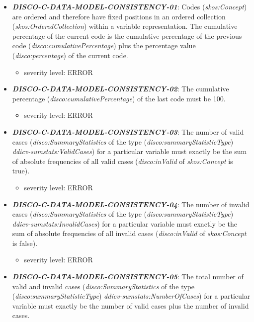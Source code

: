 \documentclass{llncs}
\begin{document}
\begin{itemize}
	\item \textbf{{\em DISCO-C-DATA-MODEL-CONSISTENCY-01}}: 
	Codes (\emph{skos:Concept}) are ordered and therefore have fixed positions in an ordered collection (\emph{skos:OrderedCollection}) within a variable representation.
	The cumulative percentage of the current code is the cumulative percentage of the previous code (\emph{disco:cumulativePercentage})
	plus the percentage value (\emph{disco:percentage}) of the current code. 
		\begin{itemize}
		\item severity level: ERROR
	\end{itemize}
	\item \textbf{{\em DISCO-C-DATA-MODEL-CONSISTENCY-02}}: 
	The cumulative percentage (\emph{disco:cumulativePercentage}) of the last code must be 100. 
		\begin{itemize}
		\item severity level: ERROR
	\end{itemize}
	\item \textbf{{\em DISCO-C-DATA-MODEL-CONSISTENCY-03}}: 
	The number of valid cases (\emph{disco:SummaryStatistics} of the type (\emph{disco:summaryStatisticType}) \emph{ddicv-sumstats:ValidCases}) 
	for a particular variable must exactly be the sum of absolute frequencies of all valid cases (\emph{disco:inValid} of \emph{skos:Concept} is true).
		\begin{itemize}
		\item severity level: ERROR
	\end{itemize}
	\item \textbf{{\em DISCO-C-DATA-MODEL-CONSISTENCY-04}}: 
	The number of invalid cases (\emph{disco:SummaryStatistics} of the type (\emph{disco:summaryStatisticType}) \emph{ddicv-sumstats:InvalidCases}) 
	for a particular variable must exactly be the sum of absolute frequencies of all invalid cases (\emph{disco:inValid} of \emph{skos:Concept} is false).
		\begin{itemize}
		\item severity level: ERROR
	\end{itemize}
	\item \textbf{{\em DISCO-C-DATA-MODEL-CONSISTENCY-05}}: 
	The total number of valid and invalid cases (\emph{disco:SummaryStatistics} of the type (\emph{disco:summaryStatisticType}) \emph{ddicv-sumstats:NumberOfCases}) 
	for a particular variable must exactly be the number of valid cases plus the number of invalid cases.

\end{itemize}
\end{document}
